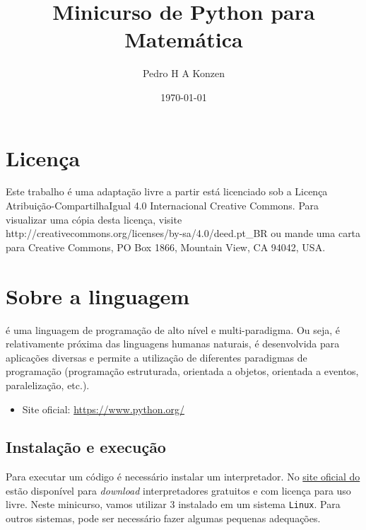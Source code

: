 \documentclass[12pt]{article}
\begin{document}
\title{Minicurso de Python para Matemática}
\author{Pedro H A Konzen}
\date{\today}

\maketitle

\tableofcontents

\section*{Licença}\label{sec_licenca}

Este trabalho é uma adaptação livre a partir está licenciado sob a Licença Atribuição-CompartilhaIgual 4.0 Internacional Creative Commons. Para visualizar uma cópia desta licença, visite http://creativecommons.org/licenses/by-sa/4.0/deed.pt\_BR ou mande uma carta para Creative Commons, PO Box 1866, Mountain View, CA 94042, USA.


\section{Sobre a linguagem}\label{sec_sobrepy}

{\python} é uma linguagem de programação de alto nível e multi-paradigma. Ou seja, é relativamente próxima das linguagens humanas naturais, é desenvolvida para aplicações diversas e permite a utilização de diferentes paradigmas de programação (programação estruturada, orientada a objetos, orientada a eventos, paralelização, etc.).

\begin{itemize}
\item Site oficial: \href{https://www.python.org/}{https://www.python.org/}
\end{itemize}

\subsection{Instalação e execução}

Para executar um código {\python} é necessário instalar um interpretador. No \href{https://www.python.org/}{site oficial do \python} estão disponível para {\it download} interpretadores gratuitos e com licença para uso livre. Neste minicurso, vamos utilizar {\python} 3 instalado em um sistema \verb+Linux+. Para outros sistemas, pode ser necessário fazer algumas pequenas adequações.
\end{document}
